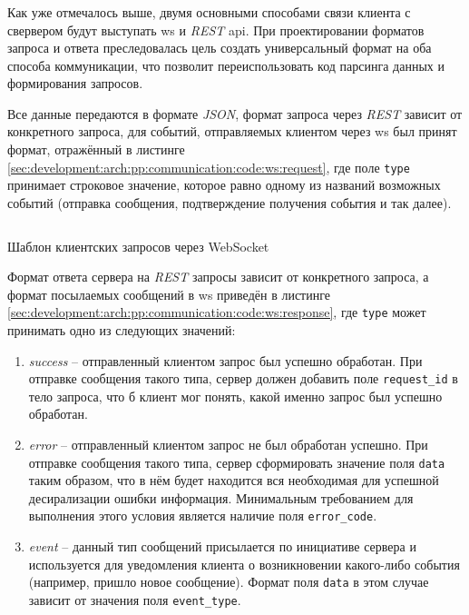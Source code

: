 \subsubsection{}
\label{sec:development:arch:pp:communication}

Как уже отмечалось выше, двумя основными способами связи клиента с свервером будут выступать \gls{ws} и \textit{REST} \gls{api}. При проектировании форматов запроса и ответа преследовалась цель создать универсальный формат на оба способа коммуникации, что позволит переиспользовать код парсинга данных и формирования запросов.

Все данные передаются в формате \textit{JSON}, формат запроса через \textit{REST} зависит от конкретного запроса, для событий, отправляемых клиентом через \gls{ws} был принят формат, отражённый в листинге \ref{sec:development:arch:pp:communication:code:ws:request}, где поле \texttt{type} принимает строковое значение, которое равно одному из названий возможных событий (отправка сообщения, подтверждение получения события и так далее).

\begin{code}
	\inputminted{json}{inc/src/client_ws_req_format.json}
   \caption{Шаблон клиентских запросов через WebSocket}
   \label{sec:development:arch:pp:communication:code:ws:request}
\end{code}

Формат ответа сервера на \textit{REST} запросы зависит от конкретного запроса, а формат посылаемых сообщений в \gls{ws} приведён в листинге \ref{sec:development:arch:pp:communication:code:ws:response}, где \texttt{type} может принимать одно из следующих значений: 

\begin{enumerate}
	\item \textit{success} -- отправленный клиентом запрос был успешно обработан. При отправке сообщения такого типа, сервер должен добавить поле \texttt{request\_id} в тело запроса, что б клиент мог понять, какой именно запрос был успешно обработан.
	\item \textit{error} -- отправленный клиентом запрос не был обработан успешно. При отправке сообщения такого типа, сервер сформировать значение поля \texttt{data} таким образом, что в нём будет находится вся необходимая для успешной десирализации ошибки информация. Минимальным требованием для выполнения этого условия является наличие поля \texttt{error\_code}.
	\item \textit{event} -- данный тип сообщений присылается по инициативе сервера и используется для уведомления клиента о возникновении какого-либо события (например, пришло новое сообщение). Формат поля \texttt{data} в этом случае зависит от значения поля \texttt{event\_type}.
\end{enumerate}

